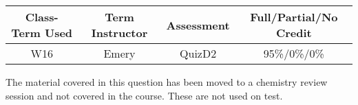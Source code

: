 \begin{outcomes}
	\begin{center}
		\begin{tabular}{cccc}
			\hline\hline
			Class-Term Used & Term Instructor & Assessment & Full/Partial/No Credit \\
			\hline
			W16 & Emery & QuizD2 & 95\%/0\%/0\%\\    %
			\hline
		\end{tabular}
	\end{center}
\end{outcomes}

\begin{comments}

The material covered in this question has been moved to a chemistry review session and not covered in the course. These are not used on test.
	
\end{comments}
